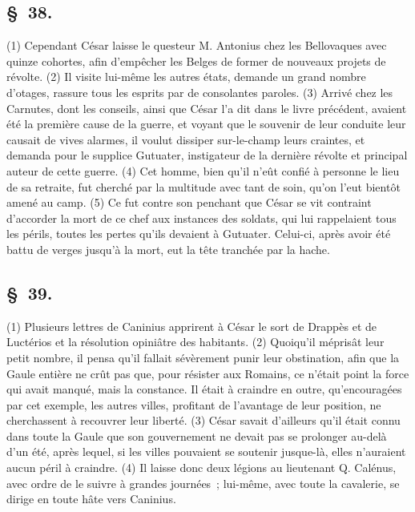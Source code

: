 \documentclass[french,twoside]{book} %
\begin{document}
\subsection[{§ 38.}]{ \textsc{§ 38.} }
\noindent (1) Cependant César laisse le questeur M. Antonius chez les Bellovaques avec quinze cohortes, afin d’empêcher les Belges de former de nouveaux projets de révolte. (2) Il visite lui-même les autres états, demande un grand nombre d’otages, rassure tous les esprits par de consolantes paroles. (3) Arrivé chez les Carnutes, dont les conseils, ainsi que César l’a dit dans le livre précédent, avaient été la première cause de la guerre, et voyant que le souvenir de leur conduite leur causait de vives alarmes, il voulut dissiper sur-le-champ leurs craintes, et demanda pour le supplice Gutuater, instigateur de la dernière révolte et principal auteur de cette guerre. (4) Cet homme, bien qu’il n’eût confié à personne le lieu de sa retraite, fut cherché par la multitude avec tant de soin, qu’on l’eut bientôt amené au camp. (5) Ce fut contre son penchant que César se vit contraint d’accorder la mort de ce chef aux instances des soldats, qui lui rappelaient tous les périls, toutes les pertes qu’ils devaient à Gutuater. Celui-ci, après avoir été battu de verges jusqu’à la mort, eut la tête tranchée par la hache.
\subsection[{§ 39.}]{ \textsc{§ 39.} }
\noindent (1) Plusieurs lettres de Caninius apprirent à César le sort de Drappès et de Luctérios et la résolution opiniâtre des habitants. (2) Quoiqu’il méprisât leur petit nombre, il pensa qu’il fallait sévèrement punir leur obstination, afin que la Gaule entière ne crût pas que, pour résister aux Romains, ce n’était point la force qui avait manqué, mais la constance. Il était à craindre en outre, qu’encouragées par cet exemple, les autres villes, profitant de l’avantage de leur position, ne cherchassent à recouvrer leur liberté. (3) César savait d’ailleurs qu’il était connu dans toute la Gaule que son gouvernement ne devait pas se prolonger au-delà d’un été, après lequel, si les villes pouvaient se soutenir jusque-là, elles n’auraient aucun péril à craindre. (4) Il laisse donc deux légions au lieutenant Q. Calénus, avec ordre de le suivre à grandes journées ; lui-même, avec toute la cavalerie, se dirige en toute hâte vers Caninius.
\end{document}
